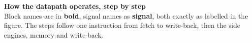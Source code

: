 \newpage
\thispagestyle{empty}
\newcommand{\sg}[1]{\textsf{\bfseries\color{black!80}#1}}     %
\newcommand{\bk}[1]{\textbf{#1}}                              %
\newcommand{\step}[2]{\par\vspace{1.6mm}{\fontsize{9}{11}\selectfont\bfseries\color{black!85}#1\enspace #2}\par\vspace{0.6mm}}
\setlength{\columnsep}{7mm}
\setlength{\columnseprule}{0.3pt}

{\fontsize{13}{15}\selectfont\textbf{How the datapath operates, step by step}}\\[1mm]
{\fontsize{8.5}{10}\selectfont Block names are in \textbf{bold}, signal names as \sg{signal}, both exactly as labelled in the figure. The steps follow one instruction from fetch to write-back, then the side engines, memory and write-back.}

